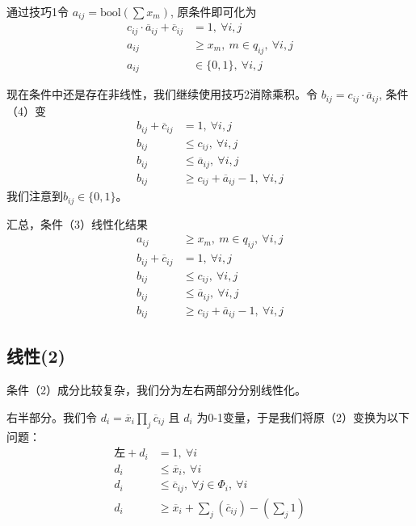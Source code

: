 \documentclass[onecolumn,times]{article}
\begin{document}
\begin{CJK}{UTF8}{gkai}
	通过技巧1令 $a_{ij}=\text{bool}(\sum x_m)$, 原条件即可化为
\begin{align}
	c_{ij} \cdot \overline{a}_{ij}
	+ \overline{c}_{ij} &= 1 ,~ \forall i,j\\
	a_{ij} &\geq x_m,~ m\in q_{ij},~ \forall i,j\\
	a_{ij} &\in \{0,1\},~ \forall i,j
\end{align}

现在条件中还是存在非线性，我们继续使用技巧2消除乘积。令
	$b_{ij} = c_{ij}\cdot \overline{a}_{ij}$, 
	条件（4）变
\begin{align}
	b_{ij} + \overline{c}_{ij} &= 1,~ \forall i,j\\
	b_{ij} &\leq c_{ij},~ \forall i,j\\
	b_{ij} &\leq \overline{a}_{ij},~ \forall i,j\\
	b_{ij} &\geq c_{ij} + \overline{a}_{ij} - 1,~ \forall i,j
\end{align}
我们注意到$b_{ij} \in \{0,1\}$。

汇总，条件（3）线性化结果
\begin{align}
	a_{ij} &\geq x_m,~ m\in q_{ij},~ \forall i,j\\
	b_{ij} + \overline{c}_{ij} &= 1,~ \forall i,j\\
	b_{ij} &\leq c_{ij},~ \forall i,j\\
	b_{ij} &\leq \overline{a}_{ij},~ \forall i,j\\
	b_{ij} &\geq c_{ij} + \overline{a}_{ij} - 1,~ \forall i,j
\end{align}

\subsection{线性(2)}

条件（2）成分比较复杂，我们分为左右两部分分别线性化。

右半部分。我们令 $d_i = \overline{x}_i \prod_j \overline{c}_{ij}$
且 $d_i$ 为0-1变量，于是我们将原（2）变换为以下问题：
\begin{align}
	\text{左} + d_i &= 1,~ \forall i\\
	d_i &\leq \overline{x}_i,~\forall i\\
	d_i &\leq \overline{c}_{ij},~\forall j\in \Phi_i,~\forall i\\
	d_i &\geq \overline{x}_i + \sum_j(\overline{c}_{ij}) - (\sum_j 1)
\end{align}


\end{CJK}
\end{document}
